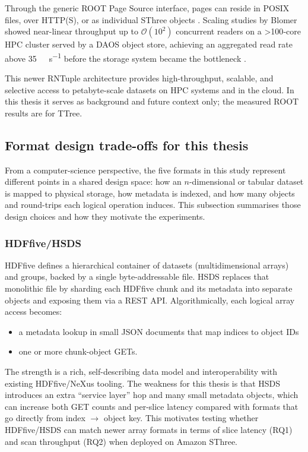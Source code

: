 \documentclass[nomenclature, english, bibtex]{kththesis}
\numberwithin{listing}{chapter}
\begin{document}
Through the generic \gls{ROOT} Page Source interface, pages can reside in \gls{POSIX} files, over \gls{HTTP}(S), or as individual \gls{SThree} objects \cite{rootRNTuple2025}. Scaling studies by Blomer showed near-linear throughput up to \(\mathcal{O}(10^{2})\) concurrent readers on a >100‐core \gls{HPC} cluster served by a \gls{DAOS} object store, achieving an aggregated read rate above \SI{35}{\giga\byte\per\second} before the storage system became the bottleneck \cite{blomer2024root}.

This newer \gls{RNTuple} architecture provides high-throughput, scalable, and selective access to petabyte-scale datasets on \gls{HPC} systems and in the cloud. In this thesis it serves as background and future context only; the measured \gls{ROOT} results are for \gls{TTree}.

\subsection{Format design trade-offs for this thesis}
\label{sec:format-tradeoffs}

From a computer-science perspective, the five formats in this study represent different points in a shared design space: how an $n$-dimensional or tabular dataset is mapped to physical storage, how metadata is indexed, and how many objects and round-trips each logical operation induces. This subsection summarises those design choices and how they motivate the experiments.

\subsubsection{\texorpdfstring{\gls{HDFfive}/\gls{HSDS}}{HDF5/HSDS}}
\gls{HDFfive} defines a hierarchical container of datasets (multidimensional arrays) and groups, backed by a single byte-addressable file. \gls{HSDS} replaces that monolithic file by sharding each \gls{HDFfive} chunk and its metadata into separate objects and exposing them via a REST \gls{API}. Algorithmically, each logical array access becomes:

\begin{itemize}
    \item a metadata lookup in small \gls{JSON} documents that map indices to object IDs
    \item one or more chunk-object GETs.
\end{itemize}

The strength is a rich, self-describing data model and interoperability with existing \gls{HDFfive}/NeXus tooling. The weakness for this thesis is that \gls{HSDS} introduces an extra “service layer” hop and many small metadata objects, which can increase both GET counts and per-slice latency compared with formats that go directly from index $\rightarrow$ object key. This motivates testing whether \gls{HDFfive}/\gls{HSDS} can match newer array formats in terms of slice latency (RQ1) and scan throughput (RQ2) when deployed on Amazon \gls{SThree}.
\end{document}
